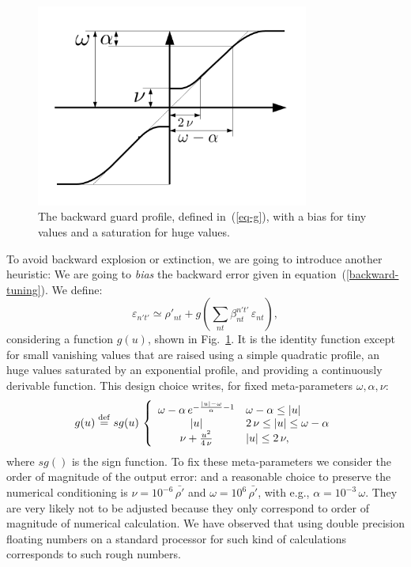 \begin{figure}[!ht]
  \includegraphics[width=0.8\textwidth]{img/backward-guard}
  \caption{The backward guard profile, defined in~(\ref{eq-g}), with a bias for tiny values and a saturation for huge values.}
  \label{backward-guard}
\end{figure}

To avoid backward explosion or extinction, we are going to introduce another heuristic: We are going to {\em bias} the backward error given in equation~(\ref{backward-tuning}). We define:
\begin{equation} \label{kappa}
\varepsilon_{n't'} \simeq \rho'_{nt} + g\left(\sum_{nt} \beta_{nt}^{n't'} \, \varepsilon_{nt}\right),
\end{equation} considering a function $g(u)$, shown in Fig.~\ref{backward-guard}. It is the identity function except for small vanishing values that are raised using a simple quadratic profile, an huge values saturated by an exponential profile, and providing a continuously derivable function. This design choice writes, for fixed meta-parameters $\omega, \alpha, \nu$:
\begin{equation}\label{eq-g} g(u) \stackrel {\rm def}{=} sg(u) \, \left\{ \begin{array}{cl} 
\omega - \alpha \, e^{-\frac{|u| - \omega}{\alpha} - 1} & \omega - \alpha \leq |u| \\
|u| & 2 \, \nu \leq |u| \leq \omega - \alpha \\
\nu + \frac{u^2}{4 \, \nu} & |u| \leq 2 \, \nu, \\
\end{array} \right.\end{equation}
where $sg()$ is the sign function. To fix these meta-parameters we consider the order of magnitude of the output error:
and a reasonable choice to preserve the numerical conditioning is $\nu = 10^{-6} \, \bar{\rho'}$ and $\omega = 10^{6} \, \bar{\rho'}$, with e.g., $\alpha = 10^{-3} \, \omega$. They are very likely not to be adjusted because they only correspond to order of magnitude of numerical calculation. We have observed that using double precision floating numbers on a standard processor for such kind of calculations corresponds to such rough numbers.

